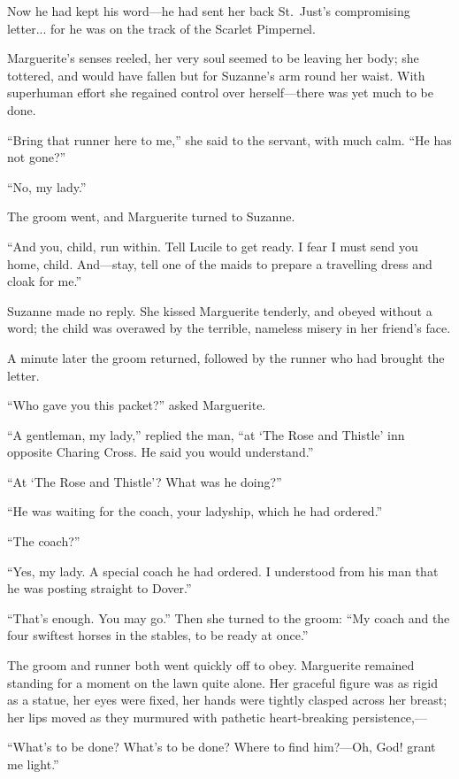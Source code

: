 \documentclass[paper=a5,BCOR=7mm,twoside,DIV=calc,12pt,usegeometry,chapterprefix,endperiod,headings=big]{scrbook}
\begin{document}
Now he had kept his word---he had sent her back St.~Just's compromising letter... for he was on the track of the Scarlet Pimpernel.

Marguerite's senses reeled, her very soul seemed to be leaving her body; she tottered, and would have fallen but for Suzanne's arm round her waist. With superhuman effort she regained control over herself---there was yet much to be done.

\enquote{Bring that runner here to me,} she said to the servant, with much calm. \enquote{He has not gone?}

\enquote{No, my lady.}

The groom went, and Marguerite turned to Suzanne.

\enquote{And you, child, run within. Tell Lucile to get ready. I fear I must send you home, child. And---stay, tell one of the maids to prepare a travelling dress and cloak for me.}

Suzanne made no reply. She kissed Marguerite tenderly, and obeyed without a word; the child was overawed by the terrible, nameless misery in her friend's face.

A minute later the groom returned, followed by the runner who had brought the letter.

\enquote{Who gave you this packet?} asked Marguerite.

\enquote{A gentleman, my lady,} replied the man, \enquote{at \enquote{The Rose and Thistle} inn opposite Charing Cross. He said you would understand.}

\enquote{At \enquote{The Rose and Thistle}? What was he doing?}

\enquote{He was waiting for the coach, your ladyship, which he had ordered.}

\enquote{The coach?}

\enquote{Yes, my lady. A special coach he had ordered. I understood from his man that he was posting straight to Dover.}

\enquote{That's enough. You may go.} Then she turned to the groom: \enquote{My coach and the four swiftest horses in the stables, to be ready at once.}

The groom and runner both went quickly off to obey. Marguerite remained standing for a moment on the lawn quite alone. Her graceful figure was as rigid as a statue, her eyes were fixed, her hands were tightly clasped across her breast; her lips moved as they murmured with pathetic heart-breaking persistence,---

\enquote{What's to be done? What's to be done? Where to find him?---Oh, God! grant me light.}
\end{document}
